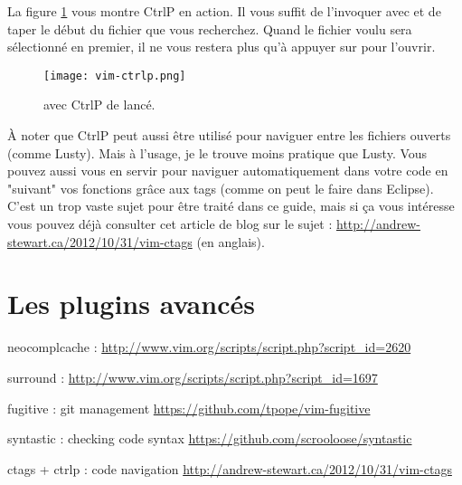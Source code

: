 La figure \ref{fig:vim-ctrlp} vous montre CtrlP en action. Il vous suffit de l'invoquer avec  et de taper le début du fichier que vous recherchez. Quand le fichier voulu sera sélectionné en premier, il ne vous restera plus qu'à appuyer sur \ttenter pour l'ouvrir.

\begin{figure}%
  \texttt{[image: vim-ctrlp.png]}
  \caption{\vim avec CtrlP de lancé.}
  \label{fig:vim-ctrlp}
\end{figure}

À noter que CtrlP peut aussi être utilisé pour naviguer entre les fichiers ouverts (comme Lusty). Mais à l'usage, je le trouve moins pratique que Lusty. Vous pouvez aussi vous en servir pour naviguer automatiquement dans votre code en "suivant" vos fonctions grâce aux tags (comme on peut le faire dans Eclipse). C'est un trop vaste sujet pour être traité dans ce guide, mais si ça vous intéresse vous pouvez déjà consulter cet article de blog sur le sujet : \url{http://andrew-stewart.ca/2012/10/31/vim-ctags} (en anglais).

\section{Les plugins avancés}

neocomplcache : \url{http://www.vim.org/scripts/script.php?script\_id=2620}

surround : \url{http://www.vim.org/scripts/script.php?script\_id=1697}

fugitive : git management \url{https://github.com/tpope/vim-fugitive}

syntastic : checking code syntax \url{https://github.com/scrooloose/syntastic}

ctags + ctrlp : code navigation \url{http://andrew-stewart.ca/2012/10/31/vim-ctags}
